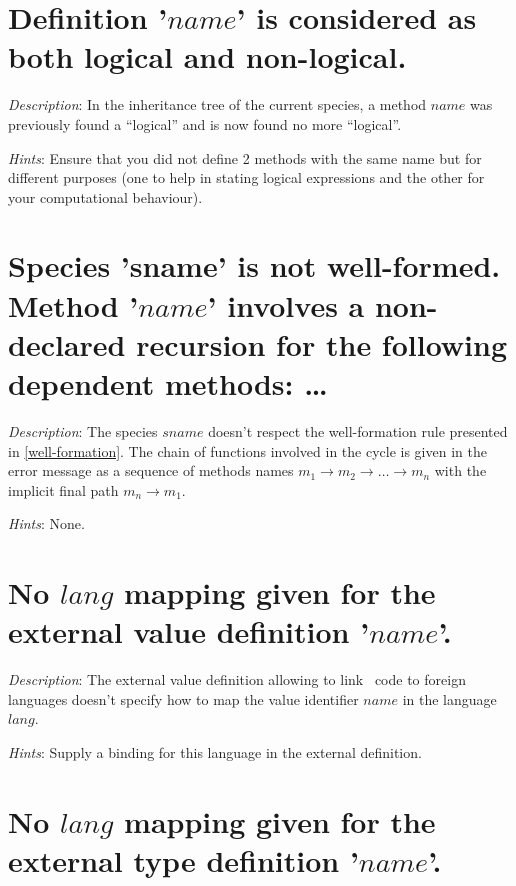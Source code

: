 \section*{Definition '$name$' is considered as both  logical and
  non-logical.}

{\em Description}: In the inheritance tree of the current species, a
method $name$ was previously found a ``logical'' and is now found no
more ``logical''.

{\em Hints}: Ensure that you did not define 2 methods with the same
name but for different purposes (one to help in stating logical
expressions and the other for your computational behaviour).



\section*{Species 'sname' is not well-formed. Method  '$name$' involves
  a non-declared recursion for the following dependent methods: \ldots}

{\em Description}: The species $sname$ doesn't respect the
well-formation rule presented in \ref{well-formation}. The chain of
functions involved in the cycle is given in the error message as a
sequence of methods names
$m_1 \rightarrow m_2 \rightarrow \ldots \rightarrow m_n$ with the
implicit final path $m_n \rightarrow m_1$.

{\em Hints}: None.



\section*{No $lang$ mapping given for the external value definition
  '$name$'.}

{\em Description}: The external value definition allowing to link
\focal\ code to foreign languages doesn't specify how to map the value
identifier $name$ in the language $lang$.

{\em Hints}: Supply a binding for this language in the external
definition.



\section*{No $lang$ mapping given for the external type definition
  '$name$'.}

